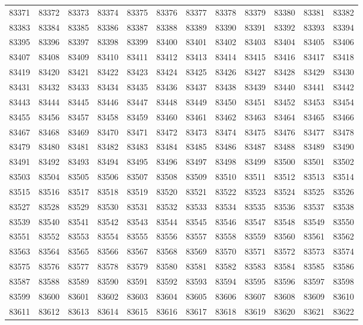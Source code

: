 \begin{center}
\begin{longtable}{llllllllllll}
83371 &83372 &83373 &83374 &83375 &83376 &83377 &83378 &83379 &83380 &83381 &83382 \\
83383 &83384 &83385 &83386 &83387 &83388 &83389 &83390 &83391 &83392 &83393 &83394 \\
83395 &83396 &83397 &83398 &83399 &83400 &83401 &83402 &83403 &83404 &83405 &83406 \\
83407 &83408 &83409 &83410 &83411 &83412 &83413 &83414 &83415 &83416 &83417 &83418 \\
83419 &83420 &83421 &83422 &83423 &83424 &83425 &83426 &83427 &83428 &83429 &83430 \\
83431 &83432 &83433 &83434 &83435 &83436 &83437 &83438 &83439 &83440 &83441 &83442 \\
83443 &83444 &83445 &83446 &83447 &83448 &83449 &83450 &83451 &83452 &83453 &83454 \\
83455 &83456 &83457 &83458 &83459 &83460 &83461 &83462 &83463 &83464 &83465 &83466 \\
83467 &83468 &83469 &83470 &83471 &83472 &83473 &83474 &83475 &83476 &83477 &83478 \\
83479 &83480 &83481 &83482 &83483 &83484 &83485 &83486 &83487 &83488 &83489 &83490 \\
83491 &83492 &83493 &83494 &83495 &83496 &83497 &83498 &83499 &83500 &83501 &83502 \\
83503 &83504 &83505 &83506 &83507 &83508 &83509 &83510 &83511 &83512 &83513 &83514 \\
83515 &83516 &83517 &83518 &83519 &83520 &83521 &83522 &83523 &83524 &83525 &83526 \\
83527 &83528 &83529 &83530 &83531 &83532 &83533 &83534 &83535 &83536 &83537 &83538 \\
83539 &83540 &83541 &83542 &83543 &83544 &83545 &83546 &83547 &83548 &83549 &83550 \\
83551 &83552 &83553 &83554 &83555 &83556 &83557 &83558 &83559 &83560 &83561 &83562 \\
83563 &83564 &83565 &83566 &83567 &83568 &83569 &83570 &83571 &83572 &83573 &83574 \\
83575 &83576 &83577 &83578 &83579 &83580 &83581 &83582 &83583 &83584 &83585 &83586 \\
83587 &83588 &83589 &83590 &83591 &83592 &83593 &83594 &83595 &83596 &83597 &83598 \\
83599 &83600 &83601 &83602 &83603 &83604 &83605 &83606 &83607 &83608 &83609 &83610 \\
83611 &83612 &83613 &83614 &83615 &83616 &83617 &83618 &83619 &83620 &83621 &83622 \\

\end{longtable}
\end{center}
